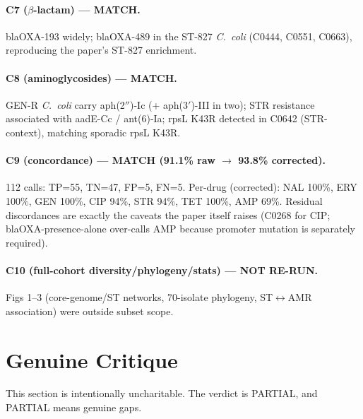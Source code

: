 \documentclass[11pt,a4paper]{article}
\begin{document}
\paragraph{C7 ($\beta$-lactam) --- MATCH.} blaOXA-193 widely; blaOXA-489 in the ST-827 \textit{C.\ coli} (C0444, C0551, C0663), reproducing the paper's ST-827 enrichment.

\paragraph{C8 (aminoglycosides) --- MATCH.} GEN-R \textit{C.\ coli} carry aph(2$''$)-Ic (+ aph(3$'$)-III in two); STR resistance associated with aadE-Cc / ant(6)-Ia; rpsL K43R detected in C0642 (STR-context), matching sporadic rpsL K43R.

\paragraph{C9 (concordance) --- MATCH (91.1\% raw $\to$ 93.8\% corrected).} 112 calls: TP=55, TN=47, FP=5, FN=5. Per-drug (corrected): NAL 100\%, ERY 100\%, GEN 100\%, CIP 94\%, STR 94\%, TET 100\%, AMP 69\%. Residual discordances are exactly the caveats the paper itself raises (C0268 for CIP; blaOXA-presence-alone over-calls AMP because promoter mutation is separately required).

\paragraph{C10 (full-cohort diversity/phylogeny/stats) --- NOT RE-RUN.} Figs 1--3 (core-genome/ST networks, 70-isolate phylogeny, ST$\leftrightarrow$AMR association) were outside subset scope.

\section{Genuine Critique}

This section is intentionally uncharitable. The verdict is PARTIAL, and PARTIAL means genuine gaps.
\end{document}
